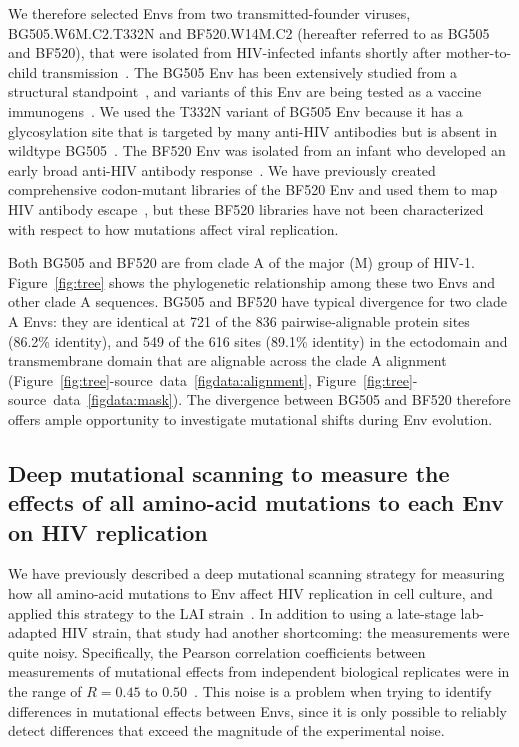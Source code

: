 \documentclass[9pt]{elife}
\begin{document}
We therefore selected Envs from two transmitted-founder viruses, BG505.W6M.C2.T332N and BF520.W14M.C2 (hereafter referred to as BG505 and BF520), that were isolated from HIV-infected infants shortly after mother-to-child transmission~\citep{goo2014early}.
The BG505 Env has been extensively studied from a structural standpoint~\citep{julien2013crystal,lyumkis2013cryo,pancera2014structure,huang2014broad,sanders2015hiv,stewart2016trimeric}, and variants of this Env are being tested as a vaccine immunogens~\citep{sanders2013next,sanders2015hiv,de2015immunogenicity}.
We used the T332N variant of BG505 Env because it has a glycosylation site that is targeted by many anti-HIV antibodies but is absent in wildtype BG505~\citep{sanders2013next}.
The BF520 Env was isolated from an infant who developed an early broad anti-HIV antibody response~\citep{goo2014early,simonich2016hiv}.
We have previously created comprehensive codon-mutant libraries of the BF520 Env and used them to map HIV antibody escape~\citep{dingens2017comprehensive}, but these BF520 libraries have not been characterized with respect to how mutations affect viral replication.

Both BG505 and BF520 are from clade A of the major (M) group of HIV-1.
Figure~\ref{fig:tree} shows the phylogenetic relationship among these two Envs and other clade A sequences.
BG505 and BF520 have typical divergence for two clade A Envs: they are identical at 721 of the 836 pairwise-alignable protein sites (86.2\% identity), and 549 of the 616 sites (89.1\% identity) in the ectodomain and transmembrane domain that are alignable across the clade A alignment (Figure~\ref{fig:tree}-source~data~\ref{figdata:alignment}, Figure~\ref{fig:tree}-source~data~\ref{figdata:mask}).
The divergence between BG505 and BF520 therefore offers ample opportunity to investigate mutational shifts during Env evolution.

\subsection{Deep mutational scanning to measure the effects of all amino-acid mutations to each Env on HIV replication}
We have previously described a deep mutational scanning strategy for measuring how all amino-acid mutations to Env affect HIV replication in cell culture, and applied this strategy to the LAI strain~\citep{haddox2016experimental}.
In addition to using a late-stage lab-adapted HIV strain, that study had another shortcoming: the measurements were quite noisy.
Specifically, the Pearson correlation coefficients between measurements of mutational effects from independent biological replicates were in the range of $R = 0.45$ to $0.50$~\citep{haddox2016experimental}.
This noise is a problem when trying to identify differences in mutational effects between Envs, since it is only possible to reliably detect differences that exceed the magnitude of the experimental noise. 
\end{document}
